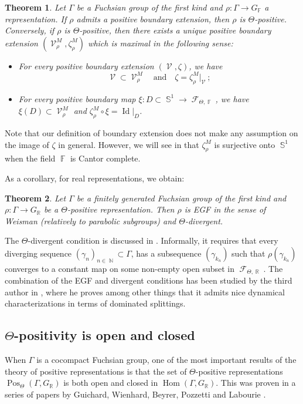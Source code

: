 \documentclass{amsart}
\theoremstyle{plain}
\newtheorem{ThmIntro}{Theorem}
\theoremstyle{definition}
\DeclareMathOperator{\Id}{Id}
\DeclareMathOperator{\Hom}{Hom}
\DeclareMathOperator{\Pos}{Pos}
\newcommand{\bdext}{{\Vc^M_\rho}}
\DeclareMathOperator{\Fc}{\mathcal{F}}
\DeclareMathOperator{\Vc}{\mathcal{V}}
\DeclareMathOperator{\Fb}{{\mathbb{F}}}
\DeclareMathOperator{\Nb}{{\mathbb{N}}}
\DeclareMathOperator{\Rb}{{\mathbb{R}}}
\DeclareMathOperator{\Sb}{\mathbb{S}}
\newcommand*\from{\colon}
\newcommand{\1}{\mathbf{1}}
\begin{document}
\begin{ThmIntro} \label{thm: Boundary Extension Intro}
    Let $\Gamma$ be a Fuchsian group of the first kind and $\rho\colon \Gamma \to G_{\Fb}$ a representation. If $\rho$ admits a positive boundary extension, then $\rho$ is $\Theta$-positive. Conversely, if $\rho$ is $\Theta$-positive, then there exists a unique positive boundary extension $(\bdext, \zeta_\rho^M)$ which is \emph{maximal} in the following sense:
    \begin{itemize}
        \item For every positive boundary extension $(\Vc, \zeta)$, we have \[\Vc \subset \bdext \quad\text{and}\quad\zeta= {\zeta_\rho^M}\vert_{ \Vc}~;\]
        \item For every positive boundary map $\xi \from D \subset \Sb^1 \to \Fc_{\Theta,\Fb}$, we have $\xi(D)\subset \bdext $ and $\zeta_\rho^M \circ \xi = \Id\vert_{ D}$.
    \end{itemize}
\end{ThmIntro}

Note that our definition of boundary extension does not make any assumption on  the image of $\zeta$ in general. However, we will see in  that $\zeta^M_\rho$ is surjective onto $\Sb^1$ when the field $\Fb$ is Cantor complete.

As a corollary, for real representations, we obtain: 
\begin{ThmIntro} \label{thm-intro: Theta-positive EGF}
    Let $\Gamma$ be a finitely generated Fuchsian group of the first kind and $\rho \from \Gamma \to G_{\Rb}$ be a $\Theta$-positive representation. Then $\rho$ is EGF in the sense of Weisman (relatively to parabolic subgroups) and $\Theta$-divergent.
\end{ThmIntro}

The $\Theta$-divergent condition is discussed in . Informally, it requires that every diverging sequence $(\gamma_n)_{n\in \Nb} \subset \Gamma$, has a subsequence $(\gamma_{k_n})$ such that $\rho(\gamma_{k_n})$ converges to a constant map on some non-empty open subset in $\Fc_{\Theta,\Rb}$. The combination of the EGF and divergent conditions has been studied by the third author in \cite{W23b}, where he proves among other things that it admits nice dynamical characterizations in terms of dominated splittings.

\subsection{%
\texorpdfstring{%
$\Theta$-positivity is open and closed}%
{Theta-positivity is open and closed}}
When $\Gamma$ is a cocompact Fuchsian group, one of the most important results of the theory of positive representations is that the set of $\Theta$-positive representations $\Pos_\Theta(\Gamma,G_{\Rb})$ is both open and closed in $\Hom(\Gamma,G_{\Rb})$. This was proven in a series of papers by Guichard, Wienhard, Beyrer, Pozzetti and Labourie \cite{GLW, beyrer2021positive,BeyrerGuichardLabouriePozzettiWienhard_PositivityCrossRatiosCollarLemma}.
\end{document}
